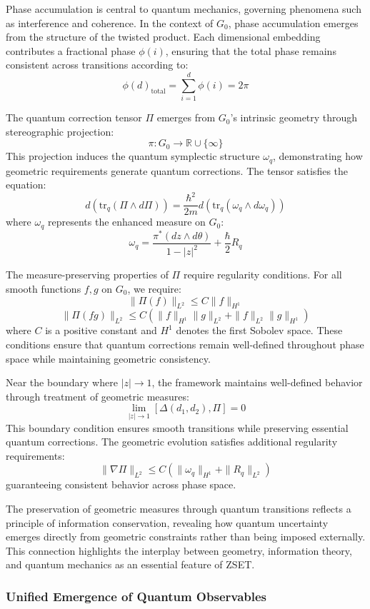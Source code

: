 \documentclass[10pt]{article}
\begin{document}
Phase accumulation is central to quantum mechanics, governing phenomena such as interference and coherence. In the context of $G_0$, phase accumulation emerges from the structure of the twisted product. Each dimensional embedding contributes a fractional phase $\phi(i)$, ensuring that the total phase remains consistent across transitions according to:
\[
\phi(d)_{\text{total}} = \sum_{i=1}^d \phi(i) = 2\pi
\]

The quantum correction tensor $\Pi$ emerges from $G_0$'s intrinsic geometry through stereographic projection:
\[
\pi: G_0 \to \mathbb{R} \cup \{\infty\}
\]
This projection induces the quantum symplectic structure $\omega_q$, demonstrating how geometric requirements generate quantum corrections. The tensor satisfies the equation:
\[
d(\text{tr}_q(\Pi \wedge d\Pi)) = \frac{\hbar^2}{2m} d(\text{tr}_q(\omega_q \wedge d\omega_q))
\]
where $\omega_q$ represents the enhanced measure on $G_0$:
\[
\omega_q = \frac{\pi^*(dz \wedge d\theta)}{1 - |z|^2} + \frac{\hbar}{2}R_q
\]

The measure-preserving properties of $\Pi$ require regularity conditions. For all smooth functions $f, g$ on $G_0$, we require:
\[
\|\Pi(f)\|_{L^2} \leq C\|f\|_{H^1}
\]
\[
\|\Pi(fg)\|_{L^2} \leq C(\|f\|_{H^1}\|g\|_{L^2} + \|f\|_{L^2}\|g\|_{H^1})
\]
where $C$ is a positive constant and $H^1$ denotes the first Sobolev space. These conditions ensure that quantum corrections remain well-defined throughout phase space while maintaining geometric consistency.

Near the boundary where $|z| \to 1$, the framework maintains well-defined behavior through treatment of geometric measures:
\[
\lim_{|z| \to 1} [\Delta(d_1,d_2), \Pi] = 0
\]
This boundary condition ensures smooth transitions while preserving essential quantum corrections. The geometric evolution satisfies additional regularity requirements:
\[
\|\nabla\Pi\|_{L^2} \leq C(\|\omega_q\|_{H^1} + \|R_q\|_{L^2})
\]
guaranteeing consistent behavior across phase space.

The preservation of geometric measures through quantum transitions reflects a principle of information conservation, revealing how quantum uncertainty emerges directly from geometric constraints rather than being imposed externally. This connection highlights the interplay between geometry, information theory, and quantum mechanics as an essential feature of ZSET.

\subsubsection{Unified Emergence of Quantum Observables}
\end{document}
